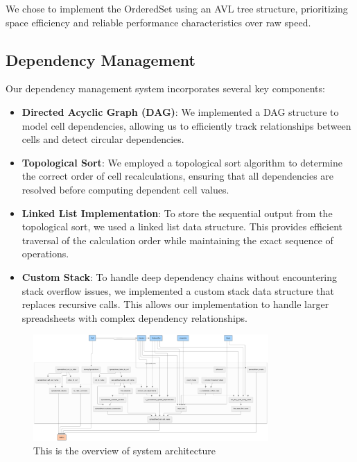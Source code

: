 \documentclass[10pt,a4paper]{article}  %
\begin{document}
We chose to implement the OrderedSet using an AVL tree structure, prioritizing space efficiency and reliable performance characteristics over raw speed.

\subsection{Dependency Management}
Our dependency management system incorporates several key components:

\begin{itemize}
    \item \textbf{Directed Acyclic Graph (DAG)}: We implemented a DAG structure to model cell dependencies, allowing us to efficiently track relationships between cells and detect circular dependencies.
    
    \item \textbf{Topological Sort}: We employed a topological sort algorithm to determine the correct order of cell recalculations, ensuring that all dependencies are resolved before computing dependent cell values.
    
    \item \textbf{Linked List Implementation}: To store the sequential output from the topological sort, we used a linked list data structure. This provides efficient traversal of the calculation order while maintaining the exact sequence of operations.
    
    \item \textbf{Custom Stack}: To handle deep dependency chains without encountering stack overflow issues, we implemented a custom stack data structure that replaces recursive calls. This allows our implementation to handle larger spreadsheets with complex dependency relationships.
\end{itemize}

\begin{figure}[h!]
    \centering
    \includegraphics[width=0.8\textwidth]{sysarch.png}
    \caption{This is the overview of system architecture}
    \label{fig:system_architecture}
\end{figure}
\end{document}
